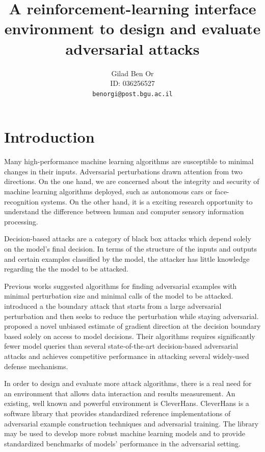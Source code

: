 \documentclass{article}
\title{A reinforcement-learning interface environment to design and evaluate adversarial attacks}
\author{
  Gilad Ben Or\\
  ID: 036256527\\
  \texttt{benorgi@post.bgu.ac.il} \\
  }
\begin{document}
\maketitle

\begin{abstract}
\lipsum[1]
\end{abstract}




\section{Introduction}
Many high-performance machine learning algorithms are susceptible to minimal changes in their inputs. Adversarial perturbations drawn attention from two directions. On the one hand, we are concerned about the integrity and security of machine learning algorithms deployed, such as autonomous cars or face-recognition systems. On the other hand, it is a exciting research opportunity to understand the difference between human and computer sensory information processing.

Decision-based attacks are a category of black box attacks which depend solely on the model's final decision. In terms of the structure of the inputs and outputs and certain examples classified by the model, the attacker has little knowledge regarding the  the model to be attacked.

Previous works suggested algorithms for finding adversarial examples with minimal perturbation size and minimal calls of the model to be attacked. \cite{brendel2017decision} introduced a the boundary attack that starts from a large adversarial perturbation and then seeks to reduce the perturbation while staying adversarial. \cite{chen2019hopskipjumpattack} proposed a novel unbiased estimate of gradient direction at the decision boundary based solely on access to model decisions. Their algorithms requires significantly fewer model queries than several state-of-the-art decision-based adversarial attacks and achieves competitive performance in attacking several widely-used defense mechanisms.

In order to design and evaluate more attack algorithms, there is a real need for an environment that allows data interaction and results measurement. An existing, well known and powerful environment is CleverHans. CleverHans \cite{papernot2018cleverhans} is a software library that provides standardized reference implementations of adversarial example construction techniques and adversarial training. The library may be used to develop more robust machine learning models and to provide standardized benchmarks of models' performance in the adversarial setting. 
\end{document}
